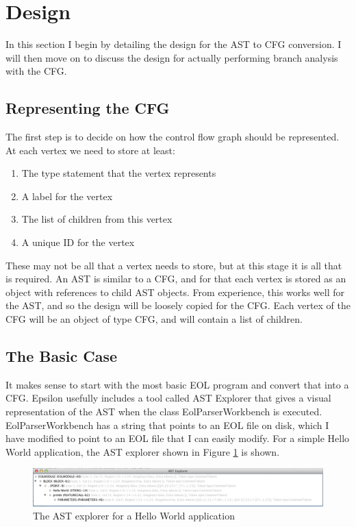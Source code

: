 \section{Design}

In this section I begin by detailing the design for the AST to CFG conversion. I will then move on to discuss the design for actually performing branch analysis with the CFG.

\subsection{Representing the CFG}

The first step is to decide on how the control flow graph should be represented. At each vertex we need to store at least:

\begin{enumerate}
\item The type statement that the vertex represents
\item A label for the vertex
\item The list of children from this vertex
\item A unique ID for the vertex
\end{enumerate}

These may not be all that a vertex needs to store, but at this stage it is all that is required. An AST is similar to a CFG, and for that each vertex is stored as an object with references to child AST objects. From experience, this works well for the AST, and so the design will be loosely copied for the CFG. Each vertex of the CFG will be an object of type CFG, and will contain a list of children.

\subsection{The Basic Case}

It makes sense to start with the most basic EOL program and convert that into a CFG. Epsilon usefully includes a tool called AST Explorer that gives a visual representation of the AST when the class EolParserWorkbench is executed. EolParserWorkbench has a string that points to an EOL file on disk, which I have modified to point to an EOL file that I can easily modify. For a simple Hello World application, the AST explorer shown in Figure \ref{fig:ASTExplorer} is shown. 

\begin{figure}
\centering
\includegraphics[width=\textwidth]{figures/ASTExplorer.png}
\caption{The AST explorer for a Hello World application}
\label{fig:ASTExplorer}
\end{figure}

